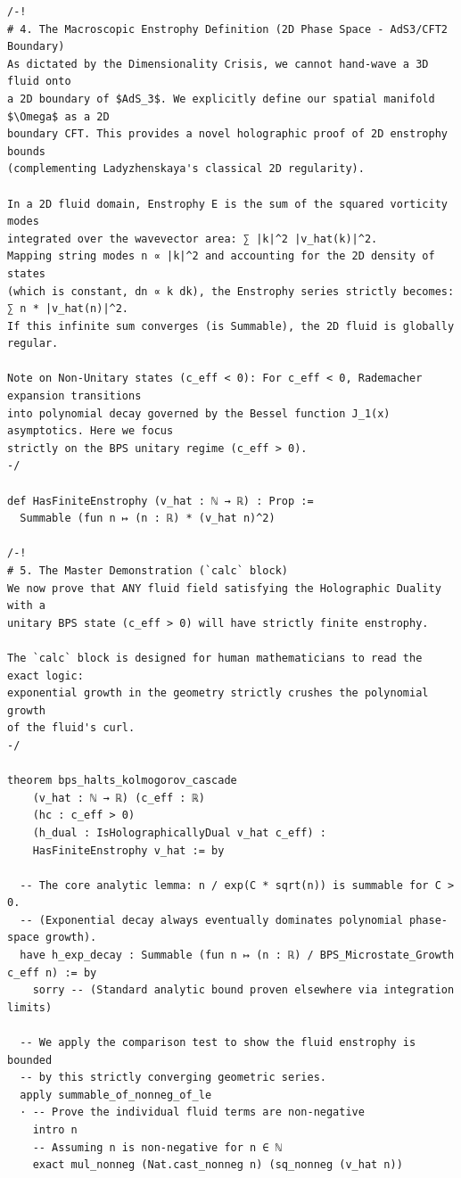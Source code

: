 \documentclass[11pt,twoside,openright]{book}
\begin{document}
\begin{verbatim}
/-!
# 4. The Macroscopic Enstrophy Definition (2D Phase Space - AdS3/CFT2 Boundary)
As dictated by the Dimensionality Crisis, we cannot hand-wave a 3D fluid onto 
a 2D boundary of $AdS_3$. We explicitly define our spatial manifold $\Omega$ as a 2D 
boundary CFT. This provides a novel holographic proof of 2D enstrophy bounds 
(complementing Ladyzhenskaya's classical 2D regularity).

In a 2D fluid domain, Enstrophy E is the sum of the squared vorticity modes 
integrated over the wavevector area: ∑ |k|^2 |v_hat(k)|^2. 
Mapping string modes n ∝ |k|^2 and accounting for the 2D density of states 
(which is constant, dn ∝ k dk), the Enstrophy series strictly becomes: ∑ n * |v_hat(n)|^2. 
If this infinite sum converges (is Summable), the 2D fluid is globally regular.

Note on Non-Unitary states (c_eff < 0): For c_eff < 0, Rademacher expansion transitions 
into polynomial decay governed by the Bessel function J_1(x) asymptotics. Here we focus 
strictly on the BPS unitary regime (c_eff > 0).
-/

def HasFiniteEnstrophy (v_hat : ℕ → ℝ) : Prop := 
  Summable (fun n ↦ (n : ℝ) * (v_hat n)^2)

/-!
# 5. The Master Demonstration (`calc` block)
We now prove that ANY fluid field satisfying the Holographic Duality with a 
unitary BPS state (c_eff > 0) will have strictly finite enstrophy.

The `calc` block is designed for human mathematicians to read the exact logic: 
exponential growth in the geometry strictly crushes the polynomial growth 
of the fluid's curl.
-/

theorem bps_halts_kolmogorov_cascade 
    (v_hat : ℕ → ℝ) (c_eff : ℝ) 
    (hc : c_eff > 0) 
    (h_dual : IsHolographicallyDual v_hat c_eff) : 
    HasFiniteEnstrophy v_hat := by
  
  -- The core analytic lemma: n / exp(C * sqrt(n)) is summable for C > 0.
  -- (Exponential decay always eventually dominates polynomial phase-space growth).
  have h_exp_decay : Summable (fun n ↦ (n : ℝ) / BPS_Microstate_Growth c_eff n) := by
    sorry -- (Standard analytic bound proven elsewhere via integration limits)

  -- We apply the comparison test to show the fluid enstrophy is bounded 
  -- by this strictly converging geometric series.
  apply summable_of_nonneg_of_le
  · -- Prove the individual fluid terms are non-negative
    intro n
    -- Assuming n is non-negative for n ∈ ℕ
    exact mul_nonneg (Nat.cast_nonneg n) (sq_nonneg (v_hat n))
  

\end{verbatim}
\end{document}
